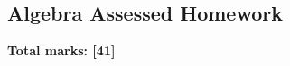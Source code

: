 \documentclass[../c1]{subfiles}
\begin{document}
\subsection*{Algebra Assessed Homework}
\thispagestyle{fancy}



\begin{flushright}
\textbf{Total marks: [41]}
\end{flushright}
\end{document}
